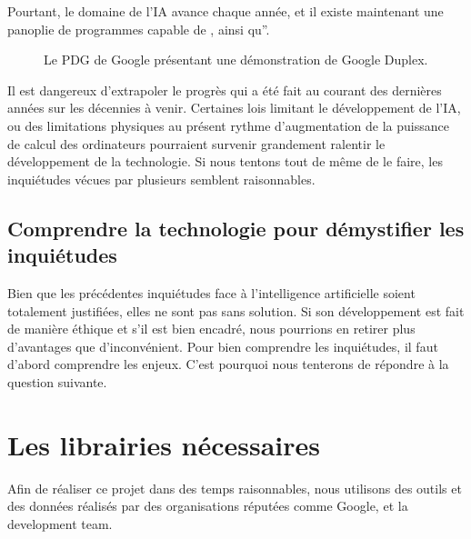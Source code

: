 \documentclass[letterpaper,10pt,french]{sphinxmanual}
\begin{document}
Pourtant, le domaine de l’IA avance chaque année, et il existe maintenant une
panoplie de programmes capable de
,
ainsi qu”.

\begin{figure}[htbp]
\centering
\capstart

\noindent{}
\caption{Le PDG de Google présentant une démonstration de Google Duplex.}\label{\detokenize{intro_finale:duplex-presentation}}\end{figure}

Il est dangereux d’extrapoler le progrès qui a été fait au courant des dernières
années sur les décennies à venir. Certaines lois limitant le développement de
l’IA, ou des limitations physiques au présent rythme d’augmentation de la
puissance de calcul des ordinateurs pourraient survenir grandement ralentir
le développement de la technologie. Si nous tentons tout de même de le faire,
les inquiétudes vécues par plusieurs semblent raisonnables.


\subsection{Comprendre la technologie pour démystifier les inquiétudes}
\label{\detokenize{intro_finale:comprendre-la-technologie-pour-demystifier-les-inquietudes}}
Bien que les précédentes inquiétudes face à l’intelligence artificielle soient
totalement justifiées, elles ne sont pas sans solution. Si son développement
est fait de manière éthique et s’il est bien encadré, nous pourrions en retirer
plus d’avantages que d’inconvénient. Pour bien comprendre les inquiétudes, il
faut d’abord comprendre les enjeux. C’est pourquoi nous tenterons de répondre
à la question suivante.



\section{Les librairies nécessaires}
\label{\detokenize{explications_librairies:les-librairies-necessaires}}\label{\detokenize{explications_librairies::doc}}
Afin de réaliser ce projet dans des temps raisonnables, nous utilisons des
outils et des données réalisés par des organisations réputées comme Google,
 et la  development team.
\end{document}
